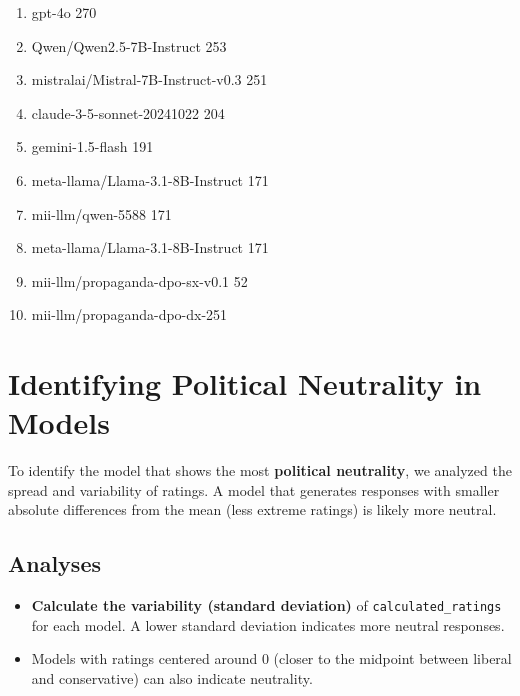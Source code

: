 \documentclass{article}
\begin{document}
\begin{enumerate}
    \item gpt-4o 270
    \item Qwen/Qwen2.5-7B-Instruct 253
    \item mistralai/Mistral-7B-Instruct-v0.3 251
    \item claude-3-5-sonnet-20241022 204
    \item gemini-1.5-flash 191
    \item meta-llama/Llama-3.1-8B-Instruct 171
    \item mii-llm/qwen-5588 171
    \item meta-llama/Llama-3.1-8B-Instruct 171
    \item mii-llm/propaganda-dpo-sx-v0.1 52
    \item mii-llm/propaganda-dpo-dx-251
\end{enumerate}

\section{Identifying Political Neutrality in Models}

To identify the model that shows the most \textbf{political neutrality}, we analyzed the spread and variability of ratings. A model that generates responses with smaller absolute differences from the mean (less extreme ratings) is likely more neutral.

\subsection{Analyses}
\begin{itemize}
    \item \textbf{Calculate the variability (standard deviation)} of \texttt{calculated\_ratings} for each model. A lower standard deviation indicates more neutral responses.
    \item Models with ratings centered around 0 (closer to the midpoint between liberal and conservative) can also indicate neutrality.
\end{itemize}
\end{document}
